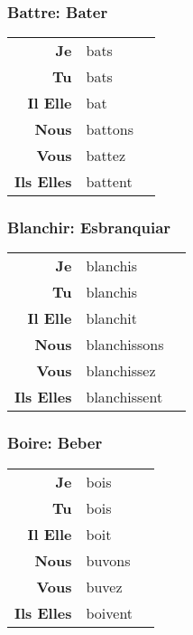 \documentclass{subfiles}
\begin{document}
\begin{multicols}{3}
        \subsubsection{Battre: Bater}
            \begin{tabular}{r l r}
                \textbf{Je}        & bats    &\\
                \textbf{Tu}        & bats    &\\
                \textbf{Il Elle}   & bat     &\\
                \textbf{Nous}      & battons &\\
                \textbf{Vous}      & battez  &\\
                \textbf{Ils Elles} & battent &
            \end{tabular} 

        \subsubsection{Blanchir: Esbranquiar}
            \begin{tabular}{r l r}
                \textbf{Je}        & blanchis     &\\
                \textbf{Tu}        & blanchis     &\\
                \textbf{Il Elle}   & blanchit     &\\
                \textbf{Nous}      & blanchissons &\\
                \textbf{Vous}      & blanchissez  &\\
                \textbf{Ils Elles} & blanchissent &
            \end{tabular}

        \subsubsection{Boire: Beber}
            \begin{tabular}{r l r}
                \textbf{Je}        & bois    &\\
                \textbf{Tu}        & bois    &\\
                \textbf{Il Elle}   & boit    &\\
                \textbf{Nous}      & buvons  &\\
                \textbf{Vous}      & buvez   &\\
                \textbf{Ils Elles} & boivent &
            \end{tabular}


\end{multicols}
\end{document}
